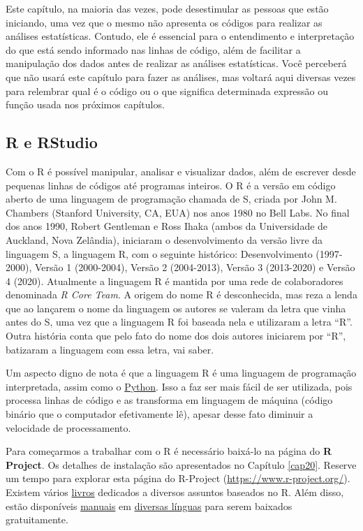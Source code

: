 \documentclass[
]{article}
\begin{document}
Este capítulo, na maioria das vezes, pode desestimular as pessoas que estão iniciando, uma vez que o mesmo não apresenta os códigos para realizar as análises estatísticas. Contudo, ele é essencial para o entendimento e interpretação do que está sendo informado nas linhas de código, além de facilitar a manipulação dos dados antes de realizar as análises estatísticas. Você perceberá que não usará este capítulo para fazer as análises, mas voltará aqui diversas vezes para relembrar qual é o código ou o que significa determinada expressão ou função usada nos próximos capítulos.

\hypertarget{r-e-rstudio}{%
\subsection{R e RStudio}\label{r-e-rstudio}}

Com o R é possível manipular, analisar e visualizar dados, além de escrever desde pequenas linhas de códigos até programas inteiros. O R é a versão em código aberto de uma linguagem de programação chamada de S, criada por John M. Chambers (Stanford University, CA, EUA) nos anos 1980 no Bell Labs. No final dos anos 1990, Robert Gentleman e Ross Ihaka (ambos da Universidade de Auckland, Nova Zelândia), iniciaram o desenvolvimento da versão livre da linguagem S, a linguagem R, com o seguinte histórico: Desenvolvimento (1997-2000), Versão 1 (2000-2004), Versão 2 (2004-2013), Versão 3 (2013-2020) e Versão 4 (2020). Atualmente a linguagem R é mantida por uma rede de colaboradores denominada \emph{R Core Team}. A origem do nome R é desconhecida, mas reza a lenda que ao lançarem o nome da linguagem os autores se valeram da letra que vinha antes do S, uma vez que a linguagem R foi baseada nela e utilizaram a letra ``R''. Outra história conta que pelo fato do nome dos dois autores iniciarem por ``R'', batizaram a linguagem com essa letra, vai saber.

Um aspecto digno de nota é que a linguagem R é uma linguagem de programação interpretada, assim como o \href{https://www.python.org/}{Python}. Isso a faz ser mais fácil de ser utilizada, pois processa linhas de código e as transforma em linguagem de máquina (código binário que o computador efetivamente lê), apesar desse fato diminuir a velocidade de processamento.

Para começarmos a trabalhar com o R é necessário baixá-lo na página do \textbf{R Project}. Os detalhes de instalação são apresentados no Capítulo \ref{cap20}. Reserve um tempo para explorar esta página do R-Project (\url{https://www.r-project.org/}). Existem vários \href{http://www.r-project.org/doc/bib/R-books.html}{livros} dedicados a diversos assuntos baseados no R. Além disso, estão disponíveis \href{http://cran.r-project.org/manuals.html}{manuais} em \href{http://cran.r-project.org/other-docs.html}{diversas línguas} para serem baixados gratuitamente.
\end{document}

